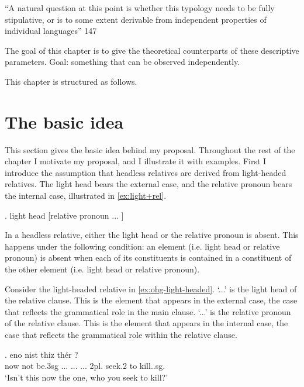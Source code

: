 ``A natural question at this point is whether this typology needs to be fully stipulative, or is to some extent derivable from independent properties of individual languages'' \citet{grosu1994}{147}

The goal of this chapter is to give the theoretical counterparts of these descriptive parameters. Goal: something that can be observed independently.

This chapter is structured as follows.


\section{The basic idea}\label{sec:basic-idea}

This section gives the basic idea behind my proposal. Throughout the rest of the chapter I motivate my proposal, and I illustrate it with examples.
First I introduce the assumption that headless relatives are derived from light-headed relatives. The light head bears the external case, and the relative pronoun bears the internal case, illustrated in \ref{ex:light+rel}.

\ex. light head [relative pronoun ... ]\label{ex:light+rel}

In a headless relative, either the light head or the relative pronoun is absent.
This happens under the following condition: an element (i.e. light head or relative pronoun) is absent when each of its constituents is contained in a constituent of the other element (i.e. light head or relative pronoun).

Consider the light-headed relative in \ref{ex:ohg-light-headed}.
 `...' is the light head of the relative clause. This is the element that appears in the external case, the case that reflects the grammatical role in the main clause.
 `...' is the relative pronoun of the relative clause. This is the element that appears in the internal case, the case that reflects the grammatical role within the relative clause.

\exg. eno nist thiz thér     ?\\
 now {not be.3\ac{sg}} ... ...
 ... 2\ac{pl}. seek.2 to kill..\ac{sg}.\\
 `Isn't this now the one, who you seek to kill?'\label{ex:ohg-light-headed}


